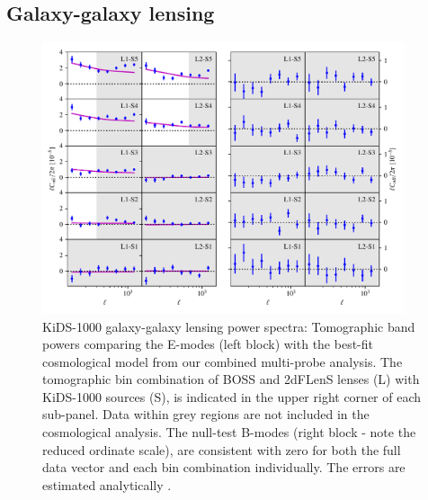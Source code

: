 \subsection{Galaxy-galaxy lensing}
\label{sec:GGL}

\begin{figure}
\begin{centering}
        \includegraphics[width=0.95\textwidth]{Data_Plots/Pgk/Pgk_K1000_2Dbins_v2_goldclasses_Flag_SOM_Fid_C.pdf}
        \caption{KiDS-1000 galaxy-galaxy lensing power spectra:
          Tomographic band powers comparing the E-modes (left block)
          with the best-fit
          cosmological model from our combined multi-probe analysis.  The tomographic 
        bin combination of BOSS and 2dFLenS lenses (L) with KiDS-1000
        sources (S), is indicated in the upper right corner of each
        sub-panel.  Data within grey regions are not included in the cosmological analysis.
        The null-test B-modes (right block - note the reduced ordinate scale), are
      consistent with zero for both the full data vector and each
     bin combination individually.  The errors are estimated analytically \citep{joachimi/etal:inprep}.}
        \label{fig:Pgk}
        \end{centering}
\end{figure}


